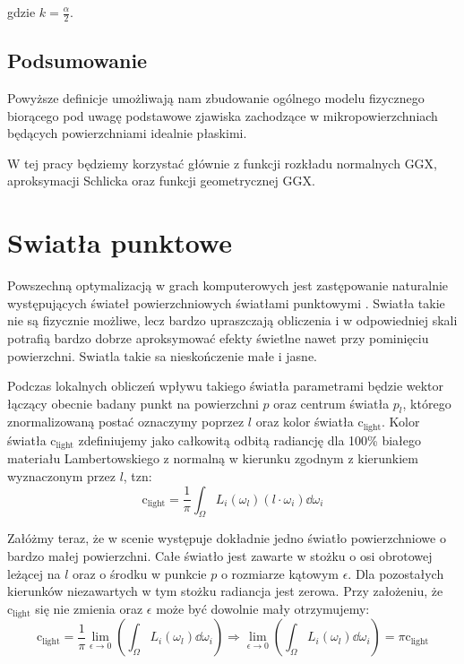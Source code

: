 \documentclass[../main.tex]{subfiles}
\newcommand{\clightcolor}{\text{c}_{\text{light}}}
\begin{document}
gdzie $k = \frac{\alpha}{2}$.

\subsection{Podsumowanie}

Powyższe definicje umożliwają nam zbudowanie ogólnego modelu fizycznego
biorącego pod uwagę podstawowe zjawiska zachodzące w mikropowierzchniach
będących powierzchniami idealnie płaskimi.

W tej pracy będziemy korzystać głównie z funkcji rozkładu normalnych GGX,
aproksymacji Schlicka oraz funkcji geometrycznej GGX.


\section{Swiatła punktowe}

Powszechną optymalizacją w grach komputerowych jest zastępowanie naturalnie występujących świateł powierzchniowych światłami punktowymi \cite{pbr_background}. Swiatła takie nie są fizycznie możliwe, lecz bardzo upraszczają obliczenia i w odpowiedniej skali potrafią bardzo dobrze aproksymować efekty świetlne nawet przy pominięciu powierzchni. Swiatla takie sa nieskończenie małe i jasne.

Podczas lokalnych obliczeń wpływu takiego światła parametrami będzie wektor łączący obecnie badany punkt na powierzchni $p$ oraz centrum światła $p_l$, którego znormalizowaną postać oznaczymy poprzez $l$ oraz kolor światła $\clightcolor$. Kolor światła $\clightcolor$ zdefiniujemy jako całkowitą odbitą radiancję dla 100\% białego materiału Lambertowskiego z normalną w kierunku zgodnym z kierunkiem wyznaczonym przez $l$, tzn:
\[
	\clightcolor = \frac{1}{\pi} \int_{\Omega} { L_i(\omega_l) (l \cdot \omega_i) \dd\omega_i }
\]

Załóżmy teraz, że w scenie występuje dokładnie jedno światło powierzchniowe o bardzo małej powierzchni. Całe światło jest zawarte w stożku o osi obrotowej leżącej na $l$ oraz o środku w punkcie $p$ o rozmiarze kątowym $\epsilon$. Dla pozostałych kierunków niezawartych w tym stożku radiancja jest zerowa. Przy założeniu, że $\clightcolor$ się nie zmienia oraz $\epsilon$ może być dowolnie mały otrzymujemy:
\[
	\clightcolor = \frac{1}{\pi} \lim_{\epsilon \rightarrow 0} \left(
		\int_{\Omega} { L_i(\omega_l) } \dd\omega_i
	\right)
	\Rightarrow
	\lim_{\epsilon \rightarrow 0} \left(\int_{\Omega} { L_i(\omega_l) } \dd\omega_i \right) = \pi\clightcolor
\]
\end{document}

